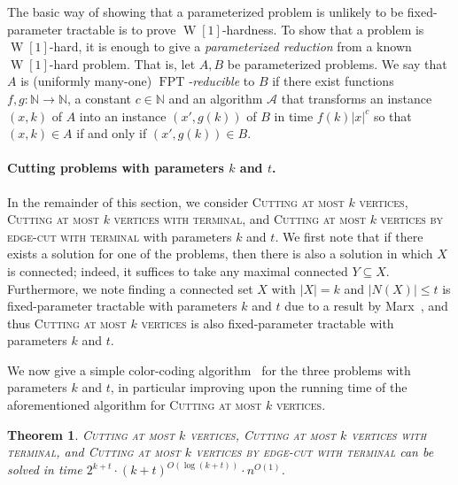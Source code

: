 \documentclass[a4paper,11pt]{article}
\newtheorem{theorem}{Theorem}
\theoremstyle{definition}
\theoremstyle{remark}
\newcommand{\card}[1]{\left\lvert {#1} \right\rvert}
\DeclareMathOperator{\operatorClassFPT}{FPT}
\newcommand{\classFPT}{\ensuremath{\operatorClassFPT}}
\DeclareMathOperator{\operatorClassW}{W}
\newcommand{\classW}[1]{\ensuremath{\operatorClassW[#1]}}
\newcommand{\vbound}[1]{\card{N(#1)}}
\begin{document}
The basic way of showing that a parameterized problem is unlikely to be fixed-parameter tractable is to prove \classW{1}-hardness. To show that a problem is \classW{1}-hard, it is enough to give a \emph{parameterized reduction} from a known \classW{1}-hard problem.
That is, let $A,B$ be parameterized problems. We say that $A$ is (uniformly many-one) {\em \classFPT{}-reducible} to $B$ if there exist functions
$f,g:\mathbb{N}\rightarrow \mathbb{N}$, a constant $c \in \mathbb{N}$ and
 an algorithm $\mathcal{A}$ that transforms an instance $(x,k)$ of $A$ into an instance $(x',g(k))$ of $B$
in time $f(k) |x|^c$ so that $(x,k) \in A$ if and only if $(x',g(k)) \in B$.


\paragraph{Cutting problems with parameters $k$ and $t$.} In the remainder of this section, we consider \textsc{Cutting at most  $k$ vertices}, \textsc{Cutting at most $k$ vertices with terminal}, and \textsc{Cutting at most  $k$ vertices by edge-cut with terminal} with parameters $k$ and $t$. We first note that if there exists a solution for one of the problems, then
there is also a solution in which $X$ is connected; 
indeed, it suffices to take any maximal connected $Y \subseteq X$. Furthermore, we note finding a connected set $X$ with $\card{X} = k$ and $\vbound{X} \le t$ is fixed-parameter tractable with parameters $k$ and $t$ due to a result by Marx~\cite[Theorem 13]{marx2006parameterized}, and thus 
\textsc{Cutting at most $k$ vertices} is also fixed-parameter tractable with parameters $k$ and $t$.

We now give a simple color-coding algorithm~\cite{AlonYZ95,cai2006random} for the three problems with parameters $k$ and $t$, in particular improving upon the running time of the aforementioned algorithm for \textsc{Cutting at most  $k$ vertices}.

\begin{theorem}\label{thm:svc_fpt_kt}
\textsc{Cutting at most  $k$ vertices}, \textsc{Cutting at most $k$ vertices with terminal}, and \textsc{Cutting at most  $k$ vertices by edge-cut with terminal} can be solved in time $2^{k + t}\cdot (k + t)^{O(\log (k+t))}\cdot n^{O(1)}$.
\end{theorem}
\end{document}
